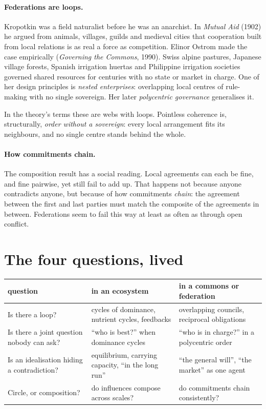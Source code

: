 \documentclass[11pt]{article}
\begin{document}
\paragraph{Federations are loops.} Kropotkin was a field naturalist before he
was an anarchist. In \emph{Mutual Aid} (1902) he argued from animals, villages,
guilds and medieval cities that cooperation built from local relations is as
real a force as competition. Elinor Ostrom made the case empirically
(\emph{Governing the Commons}, 1990). Swiss alpine pastures, Japanese village
forests, Spanish irrigation huertas and Philippine irrigation societies
governed shared resources for centuries with no state or market in charge. One
of her design principles is \emph{nested enterprises}: overlapping local centres
of rule-making with no single sovereign. Her later \emph{polycentric governance}
generalises it.

In the theory's terms these are webs with loops. Pointless coherence is,
structurally, \emph{order without a sovereign}: every local arrangement fits its
neighbours, and no single centre stands behind the whole.

\paragraph{How commitments chain.} The composition result has a social reading.
Local agreements can each be fine, and fine pairwise, yet still fail to add up.
That happens not because anyone contradicts anyone, but because of how
commitments \emph{chain}: the agreement between the first and last parties
must match the composite of the agreements in between. Federations seem to fail
this way at least as often as through open conflict.

\section{The four questions, lived}
\begin{center}\small
\begin{tabular}{|>{\raggedright\arraybackslash}p{3.9cm}|>{\raggedright\arraybackslash}p{4.6cm}|>{\raggedright\arraybackslash}p{4.6cm}|}
\hline
\textbf{question} & \textbf{in an ecosystem} & \textbf{in a commons or federation}\\\hline
Is there a loop? & cycles of dominance, nutrient cycles, feedbacks & overlapping councils, reciprocal obligations\\\hline
Is there a joint question nobody can ask? & ``who is best?'' when dominance cycles & ``who is in charge?'' in a polycentric order\\\hline
Is an idealisation hiding a contradiction? & equilibrium, carrying capacity, ``in the long run'' & ``the general will'', ``the market'' as one agent\\\hline
Circle, or composition? & do influences compose across scales? & do commitments chain consistently?\\\hline
\end{tabular}
\end{center}
\end{document}
